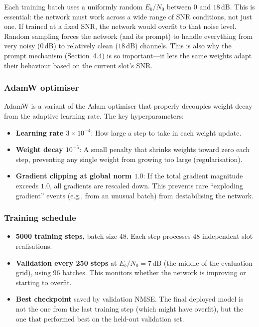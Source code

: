 \documentclass[11pt,a4paper]{article}
\begin{document}
	Each training batch uses a uniformly random $E_b/N_0$ between $0$ and $18$\,dB.  This is essential: the network must work across a wide range of SNR conditions, not just one.  If trained at a fixed SNR, the network would overfit to that noise level.  Random sampling forces the network (and its prompt) to handle everything from very noisy ($0$\,dB) to relatively clean ($18$\,dB) channels.  This is also why the prompt mechanism (Section~4.4) is so important---it lets the same weights adapt their behaviour based on the current slot's SNR.
	
	\subsubsection*{AdamW optimiser}
	
	AdamW is a variant of the Adam optimiser that properly decouples weight decay from the adaptive learning rate.  The key hyperparameters:
	\begin{itemize}[nosep]
		\item \textbf{Learning rate $3 \times 10^{-4}$}: How large a step to take in each weight update.
		\item \textbf{Weight decay $10^{-5}$}: A small penalty that shrinks weights toward zero each step, preventing any single weight from growing too large (regularisation).
		\item \textbf{Gradient clipping at global norm $1.0$}: If the total gradient magnitude exceeds $1.0$, all gradients are rescaled down.  This prevents rare ``exploding gradient'' events (e.g., from an unusual batch) from destabilising the network.
	\end{itemize}
	
	\subsubsection*{Training schedule}
	
	\begin{itemize}[nosep]
		\item \textbf{5000 training steps,} batch size 48.  Each step processes 48 independent slot realisations.
		\item \textbf{Validation every 250 steps} at $E_b/N_0 = 7$\,dB (the middle of the evaluation grid), using 96 batches.  This monitors whether the network is improving or starting to overfit.
		\item \textbf{Best checkpoint} saved by validation NMSE.  The final deployed model is not the one from the last training step (which might have overfit), but the one that performed best on the held-out validation set.
	\end{itemize}
	
\end{document}
